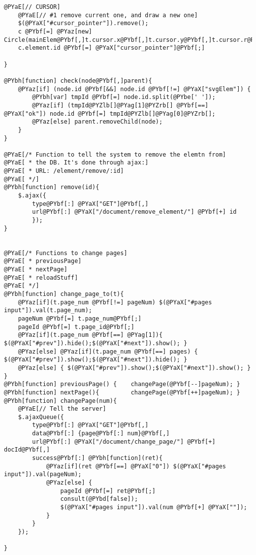 \begin{Verbatim}[commandchars=@\[\]]
	@PYaE[// CURSOR]
	@PYaE[// #1 remove current one, and draw a new one]
	$(@PYaX["#cursor_pointer"]).remove();
	c @PYbf[=] @PYaz[new] Circle(mainElem@PYbf[,]t.cursor.x@PYbf[,]t.cursor.y@PYbf[,]t.cursor.r@PYbf[,]t.cursor.r@PYbf[,]@PYaX["red"]@PYbf[,]@PYag[2]@PYbf[,]@PYag[90]);
	c.element.id @PYbf[=] @PYaX["cursor_pointer"]@PYbf[;]

}

@PYbh[function] check(node@PYbf[,]parent){
	@PYaz[if] (node.id @PYbf[&&] node.id @PYbf[!=] @PYaX["svgElem"]) {
		@PYbh[var] tmpId @PYbf[=] node.id.split(@PYbe[' ']);
		@PYaz[if] (tmpId@PYZlb[]@PYag[1]@PYZrb[] @PYbf[==] @PYaX["ok"]) node.id @PYbf[=] tmpId@PYZlb[]@PYag[0]@PYZrb[];
		@PYaz[else] parent.removeChild(node);
	}
}

@PYaE[/* Function to tell the system to remove the elemtn from]
@PYaE[ * the DB. It's done through ajax:]
@PYaE[ * URL: /element/remove/:id]
@PYaE[ */]
@PYbh[function] remove(id){
	$.ajax({
		type@PYbf[:] @PYaX["GET"]@PYbf[,]
		url@PYbf[:] @PYaX["/document/remove_element/"] @PYbf[+] id
		});
}


@PYaE[/* Functions to change pages]
@PYaE[ * previousPage]
@PYaE[ * nextPage]
@PYaE[ * reloadStuff]
@PYaE[ */]
@PYbh[function] change_page_to(t){
	@PYaz[if](t.page_num @PYbf[!=] pageNum) $(@PYaX["#pages input"]).val(t.page_num);
	pageNum @PYbf[=] t.page_num@PYbf[;]
	pageId @PYbf[=] t.page_id@PYbf[;]
	@PYaz[if](t.page_num @PYbf[==] @PYag[1]){ $(@PYaX["#prev"]).hide();$(@PYaX["#next"]).show(); }
	@PYaz[else] @PYaz[if](t.page_num @PYbf[==] pages) { $(@PYaX["#prev"]).show();$(@PYaX["#next"]).hide(); }
	@PYaz[else] { $(@PYaX["#prev"]).show();$(@PYaX["#next"]).show(); }
}
@PYbh[function] previousPage() { 	changePage(@PYbf[--]pageNum); }
@PYbh[function] nextPage(){ 		changePage(@PYbf[++]pageNum); }
@PYbh[function] changePage(num){
	@PYaE[// Tell the server]
	$.ajaxQueue({
		type@PYbf[:] @PYaX["GET"]@PYbf[,]
		data@PYbf[:] {page@PYbf[:] num}@PYbf[,]
		url@PYbf[:] @PYaX["/document/change_page/"] @PYbf[+] docId@PYbf[,]
		success@PYbf[:] @PYbh[function](ret){
			@PYaz[if](ret @PYbf[==] @PYaX["0"]) $(@PYaX["#pages input"]).val(pageNum);
			@PYaz[else] {
				pageId @PYbf[=] ret@PYbf[;]	
				consult(@PYbd[false]);
				$(@PYaX["#pages input"]).val(num @PYbf[+] @PYaX[""]);
			}
		}
	});
	
}
\end{Verbatim}




